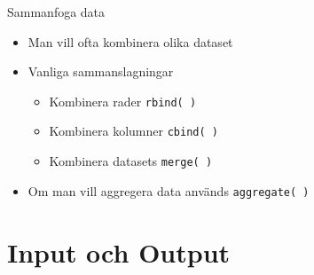 \documentclass[
  11pt,
  ignorenonframetext,
]{beamer}
\providecommand{\tightlist}{%
  \setlength{\itemsep}{0pt}\setlength{\parskip}{0pt}}
\begin{document}
\begin{frame}{Sammanfoga data}
\protect\hypertarget{sammanfoga-data}{}
\begin{itemize}
\tightlist
\item
  Man vill ofta kombinera olika dataset
\item
  Vanliga sammanslagningar

  \begin{itemize}
  \tightlist
  \item
    Kombinera rader \texttt{rbind( )}
  \item
    Kombinera kolumner \texttt{cbind( )}
  \item
    Kombinera datasets \texttt{merge( )}
  \end{itemize}
\item
  Om man vill aggregera data används \texttt{aggregate( )}
\end{itemize}
\end{frame}

\hypertarget{input-och-output}{%
\section{Input och Output}\label{input-och-output}}

\end{document}
